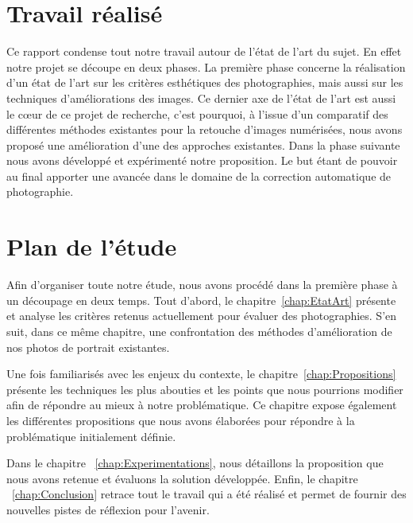 \documentclass[11pt, french]{report-rd-info}
\begin{document}
\section{Travail réalisé}
Ce rapport condense tout notre travail autour de l'état de l'art du sujet. En effet notre projet se découpe en deux phases. La première phase concerne la réalisation d'un état de l'art sur les critères esthétiques des photographies, mais aussi sur les techniques d'améliorations des images. Ce dernier axe de l'état de l'art est aussi le cœur de ce projet de recherche, c'est pourquoi, à l'issue d'un comparatif des différentes méthodes existantes pour la retouche d'images numérisées, nous avons proposé une amélioration d'une des approches existantes.
Dans la phase suivante nous avons développé et expérimenté notre proposition. Le but étant de pouvoir au final apporter une avancée dans le domaine de la correction automatique de photographie.

 

\section{Plan de l'étude}
Afin d'organiser toute notre étude, nous avons procédé dans la première phase à un découpage en deux temps. Tout d'abord, le chapitre~\ref{chap:EtatArt} présente et analyse les critères retenus actuellement pour évaluer des photographies. S'en suit, dans ce même chapitre, une confrontation des méthodes d'amélioration de nos photos de portrait existantes.

Une fois familiarisés avec les enjeux du contexte, le chapitre~\ref{chap:Propositions} présente les techniques les plus abouties et les points que nous pourrions modifier afin de répondre au mieux à notre problématique. Ce chapitre expose également les différentes propositions que nous avons élaborées pour répondre à la problématique initialement définie.

Dans le chapitre ~\ref{chap:Experimentations}, nous détaillons la proposition que nous avons retenue et évaluons la solution développée.
Enfin, le chapitre ~\ref{chap:Conclusion} retrace tout le travail qui a été réalisé et permet de fournir des nouvelles pistes de réflexion pour l'avenir.

\end{document}
